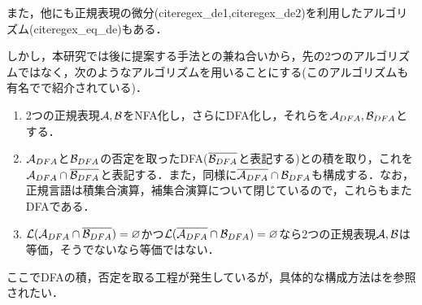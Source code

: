 \documentclass[a4paper, 12pt, dvipdfmx, uplatex]{jsreport}
\begin{document}
また，他にも正規表現の微分(cite{regex_de1},cite{regex_de2})を利用したアルゴリズム(cite{regex_eq_de})もある．

しかし，本研究では後に提案する手法との兼ね合いから，先の2つのアルゴリズムではなく，次のようなアルゴリズムを用いることにする(このアルゴリズムも有名で\cite{sipser}で紹介されている)．

\begin{enumerate}
  \item 2つの正規表現$\mathcal{A},\mathcal{B}$をNFA化し，さらにDFA化し，それらを$\mathcal{A}_{DFA},\mathcal{B}_{DFA}$とする．
  \item $\mathcal{A}_{DFA}$と$\mathcal{B}_{DFA}$の否定を取ったDFA($\overline{\mathcal{B}_{DFA}}$と表記する)との積を取り，これを$\mathcal{A}_{DFA}\cap\overline{\mathcal{B}_{DFA}}$と表記する．また，同様に$\overline{\mathcal{A}_{DFA}}\cap\mathcal{B}_{DFA}$も構成する．なお，正規言語は積集合演算，補集合演算について閉じているので，これらもまたDFAである．
  \item $\mathcal{L}(\mathcal{A}_{DFA}\cap\overline{\mathcal{B}_{DFA}})=\varnothing$かつ$\mathcal{L}(\overline{\mathcal{A}_{DFA}}\cap\mathcal{B}_{DFA})=\varnothing$なら2つの正規表現$\mathcal{A},\mathcal{B}$は等価，そうでないなら等価ではない．
\end{enumerate}

ここでDFAの積，否定を取る工程が発生しているが，具体的な構成方法は\cite{sipser}を参照されたい．













\end{document}
